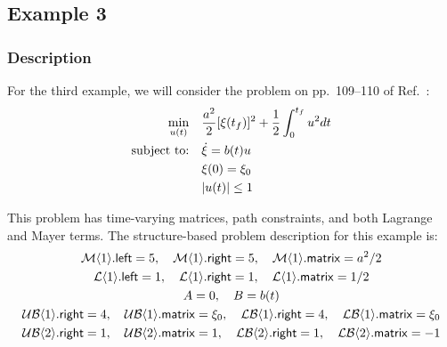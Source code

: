 \subsection{Example 3} \label{sec:ch5:example3}

\subsubsection{Description}

For the third example, we will consider the problem on pp.~109--110 of Ref.~\cite{Bryson1975a}:
\begin{subequations}%
\begin{align}
\min_{u(t)} \quad & \frac{a^2}{2} [ \xi(t_f) ]^2 + \frac{1}{2}\int_{0}^{t_f} u^2 dt \\
\text{subject to:} \quad  & \dot{\xi} = b(t) u \\
& \xi(0) = \xi_0 \\
& \lvert u(t)\rvert \leq 1
\end{align}
\end{subequations}%

\noindent This problem has time-varying matrices, path constraints, and both Lagrange and Mayer terms.
The structure-based problem description for this example is:
\allowdisplaybreaks[1]%
\begin{subequations}%
\begin{gather}
\mathcal{M}\langle{1}\rangle.\textup{\textsf{left}} = 5, \quad \mathcal{M}\langle{1}\rangle.\textup{\textsf{right}} = 5, \quad \mathcal{M}\langle{1}\rangle.\textup{\textsf{matrix}} = a^2/2 \\
\mathcal{L}\langle{1}\rangle.\textup{\textsf{left}} = 1, \quad \mathcal{L}\langle{1}\rangle.\textup{\textsf{right}} = 1, \quad \mathcal{L}\langle{1}\rangle.\textup{\textsf{matrix}} = 1/2 \\
A = 0, \quad B = b(t) \\
\mathcal{UB}\langle{1}\rangle.\textup{\textsf{right}} = 4, \quad \mathcal{UB}\langle{1}\rangle.\textup{\textsf{matrix}} = \xi_0, \quad
\mathcal{LB}\langle{1}\rangle.\textup{\textsf{right}} = 4, \quad \mathcal{LB}\langle{1}\rangle.\textup{\textsf{matrix}} = \xi_0 \\
\mathcal{UB}\langle{2}\rangle.\textup{\textsf{right}} = 1, \quad \mathcal{UB}\langle{2}\rangle.\textup{\textsf{matrix}} = 1, \quad
\mathcal{LB}\langle{2}\rangle.\textup{\textsf{right}} = 1, \quad \mathcal{LB}\langle{2}\rangle.\textup{\textsf{matrix}} = -1
\end{gather}
\end{subequations}%
\allowdisplaybreaks[0]%

